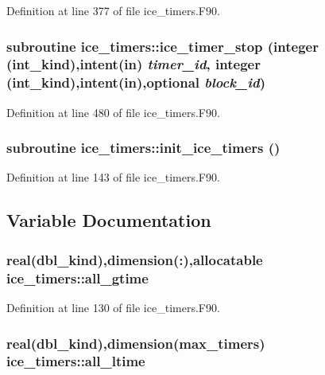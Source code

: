 Definition at line 377 of file ice\_\-timers.F90.\hypertarget{namespaceice__timers_ab483bb3b29e1839baf5a6bc2ad720ca8}{
\subsubsection[{ice\_\-timer\_\-stop}]{\setlength{\rightskip}{0pt plus 5cm}subroutine ice\_\-timers::ice\_\-timer\_\-stop (integer (int\_\-kind),intent(in) {\em timer\_\-id}, \/  integer (int\_\-kind),intent(in),optional {\em block\_\-id})}}
\label{namespaceice__timers_ab483bb3b29e1839baf5a6bc2ad720ca8}


Definition at line 480 of file ice\_\-timers.F90.\hypertarget{namespaceice__timers_aee6dba44293652055d7e94592a9496da}{
\subsubsection[{init\_\-ice\_\-timers}]{\setlength{\rightskip}{0pt plus 5cm}subroutine ice\_\-timers::init\_\-ice\_\-timers ()}}
\label{namespaceice__timers_aee6dba44293652055d7e94592a9496da}


Definition at line 143 of file ice\_\-timers.F90.

\subsection{Variable Documentation}
\hypertarget{namespaceice__timers_ac5562b4ab5e728d8135200ab10795610}{
\subsubsection[{all\_\-gtime}]{\setlength{\rightskip}{0pt plus 5cm}real(dbl\_\-kind),dimension(:),allocatable {\bf ice\_\-timers::all\_\-gtime}}}
\label{namespaceice__timers_ac5562b4ab5e728d8135200ab10795610}


Definition at line 130 of file ice\_\-timers.F90.\hypertarget{namespaceice__timers_a3974283b5a3de2b611895ae971fb9b86}{
\subsubsection[{all\_\-ltime}]{\setlength{\rightskip}{0pt plus 5cm}real(dbl\_\-kind),dimension({\bf max\_\-timers}) {\bf ice\_\-timers::all\_\-ltime}}}
\label{namespaceice__timers_a3974283b5a3de2b611895ae971fb9b86}



